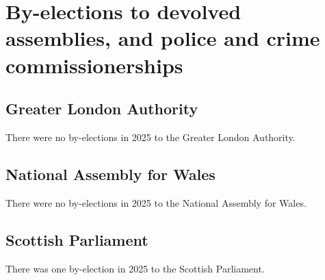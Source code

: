 \documentclass[a4paper,openany]{book}
\begin{document}
%
%
%

\chapter{By-elections to devolved assemblies, and police and crime commissionerships}

\section{Greater London Authority}

There were no by-elections in 2025 to the Greater London Authority.


\section{National Assembly for Wales}

There were no by-elections in 2025 to the National Assembly for Wales.


\section{Scottish Parliament}

There was one by-election in 2025 to the Scottish Parliament.
\end{document}
